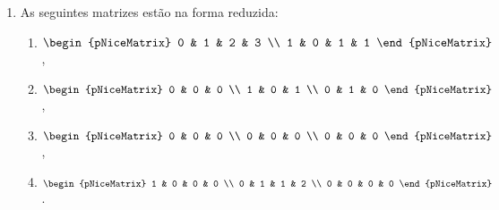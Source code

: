 \begin{example}
  \begin{enumerate}
    \item

          As seguintes matrizes estão na forma reduzida:
          \begin{multicols}{2}

            \begin{enumerate}
              \item
                    \begin{math}
                      \begin{pNiceMatrix}
                        0 & 1 & 2 & 3 \\
                        1 & 0 & 1 & 1
                      \end{pNiceMatrix}
                    \end{math},
              \item

                    \begin{math}
                      \begin{pNiceMatrix}
                        0 & 0 & 0 \\
                        1 & 0 & 1 \\
                        0 & 1 & 0
                      \end{pNiceMatrix}
                    \end{math},

              \item

                    \begin{math}
                      \begin{pNiceMatrix}
                        0 & 0 & 0 \\
                        0 & 0 & 0 \\
                        0 & 0 & 0
                      \end{pNiceMatrix}
                    \end{math},

              \item

                    \begin{math}
                      \begin{pNiceMatrix}
                        1 & 0 & 0 & 0 \\
                        0 & 1 & 1 & 2 \\
                        0 & 0 & 0 & 0
                      \end{pNiceMatrix}
                    \end{math}.
            \end{enumerate}
          \end{multicols}


\end{enumerate}
\end{example}
